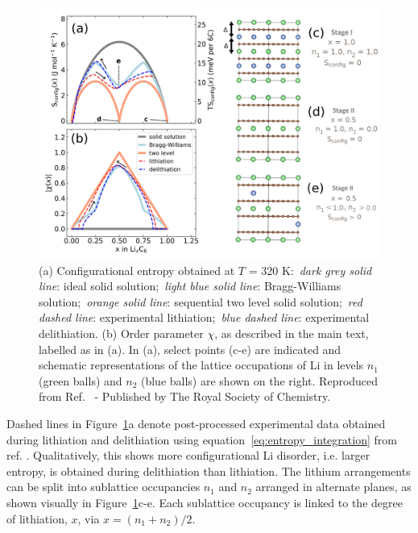 \documentclass[../main.tex]{subfiles}
\begin{document}
\begin{figure}
    \centering
    \includegraphics[scale=0.36]{figures/order_parameter_scheme_v2.jpg}
    \caption{(a) Configurational entropy obtained at $T$ = 320 K:~\emph{dark grey solid line}: ideal solid solution;~\emph{light blue solid line}: Bragg-Williams solution;~\emph{orange solid line}: sequential two level solid solution;~\emph{red dashed line}: experimental lithiation;~\emph{blue dashed line}: experimental delithiation. (b) Order parameter \textbar{}\(\chi\)\textbar{}, as described in the main text, labelled as in (a). In (a), select points (c-e) are indicated and schematic representations of the lattice occupations of Li in levels $n_{1}$ (green balls) and $n_{2}$ (blue balls) are shown on the right. Reproduced from Ref.~ - Published by The Royal Society of Chemistry.}
    \label{fig:entropy_scheme}
\end{figure}

Dashed lines in Figure~\ref{fig:entropy_scheme}a denote post-processed experimental data obtained during lithiation and delithiation using equation~\ref{eq:entropy_integration} from ref. . Qualitatively, this shows more configurational Li disorder, i.e. larger entropy, is obtained during delithiation than lithiation. The lithium arrangements can be split into sublattice occupancies $n_{1}$ and $n_{2}$ arranged in alternate planes, as shown visually in Figure~\ref{fig:entropy_scheme}c-e. Each sublattice occupancy is linked to the degree of lithiation, $x$, via $x = (n_{1} + n_{2})/2$.
\end{document}
